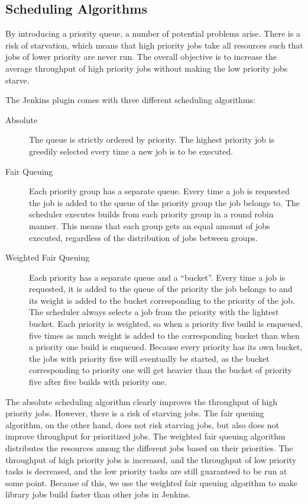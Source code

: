 \subsection{Scheduling Algorithms}
By introducing a priority queue, a number of potential problems arise. There is a risk of starvation, which means that high priority jobs take all resources such that jobs of lower priority are never run. The overall objective is to increase the average throughput of high priority jobs without making the low priority jobs starve.

The Jenkins plugin comes with three different scheduling algorithms:

\begin{description}
  \item[Absolute] The queue is strictly ordered by priority. The highest priority job is greedily selected every time a new job is to be executed.
  \item[Fair Queuing] Each priority group has a separate queue. Every time a job is requested the job is added to the queue of the priority group the job belongs to. The scheduler executes builds from each priority group in a round robin manner. This means that each group gets an equal amount of jobs executed, regardless of the distribution of jobs between groups.
  \item[Weighted Fair Queuing] Each priority has a separate queue and a ``bucket''. Every time a job is requested, it is added to the queue of the priority the job belongs to and its weight is added to the bucket corresponding to the priority of the job. The scheduler always selects a job from the priority with the lightest bucket. Each priority is weighted, so when a priority five build is enqueued, five times as much weight is added to the corresponding bucket than when a priority one build is enqueued. Because every priority has its own bucket, the jobs with priority five will eventually be started, as the bucket corresponding to priority one will get heavier than the bucket of priority five after five builds with priority one.
\end{description}

The absolute scheduling algorithm clearly improves the throughput of high priority jobs. However, there is a risk of starving jobs. The fair queuing algorithm, on the other hand, does not risk starving jobs, but also does not improve throughput for prioritized jobs. The weighted fair queuing algorithm distributes the resources among the different jobs based on their priorities. The throughput of high priority jobs is increased, and the throughput of low priority tasks is decreased, and the low priority tasks are still guaranteed to be run at some point. Because of this, we use the weighted fair queuing algorithm to make library jobs build faster than other jobs in Jenkins.

